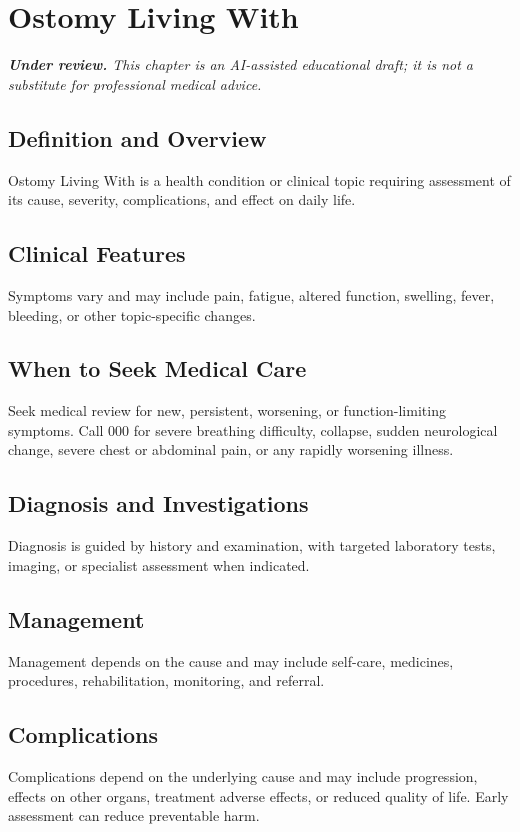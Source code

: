 \chapter{Ostomy Living With}

\medskip
\noindent\textit{\textbf{Under review.} This chapter is an AI-assisted educational draft; it is not a substitute for professional medical advice.}

\section*{Definition and Overview}
Ostomy Living With is a health condition or clinical topic requiring assessment of its cause, severity, complications, and effect on daily life.

\section*{Clinical Features}
Symptoms vary and may include pain, fatigue, altered function, swelling, fever, bleeding, or other topic-specific changes.

\section*{When to Seek Medical Care}
Seek medical review for new, persistent, worsening, or function-limiting symptoms. Call 000 for severe breathing difficulty, collapse, sudden neurological change, severe chest or abdominal pain, or any rapidly worsening illness.

\section*{Diagnosis and Investigations}
Diagnosis is guided by history and examination, with targeted laboratory tests, imaging, or specialist assessment when indicated.

\section*{Management}
Management depends on the cause and may include self-care, medicines, procedures, rehabilitation, monitoring, and referral.

\section*{Complications}
Complications depend on the underlying cause and may include progression, effects on other organs, treatment adverse effects, or reduced quality of life. Early assessment can reduce preventable harm.

